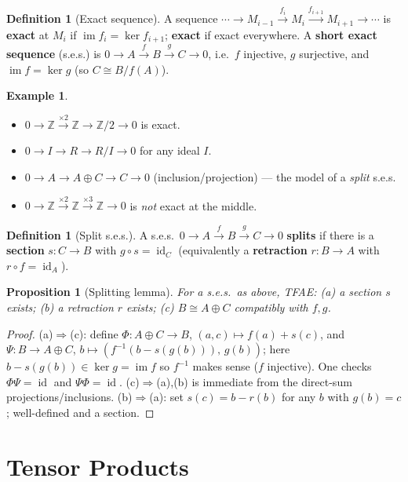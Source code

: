 \documentclass[11pt,a4paper]{article}
\newtheorem{proposition}[theorem]{Proposition}
\theoremstyle{definition}
\newtheorem{definition}[theorem]{Definition}
\newtheorem{example}[theorem]{Example}
\newcommand{\Z}{\mathbb{Z}}
\newcommand{\id}{\operatorname{id}}
\newcommand{\im}{\operatorname{im}}
\begin{document}
\begin{definition}[Exact sequence]
A sequence $\cdots\to M_{i-1}\xrightarrow{f_i} M_i\xrightarrow{f_{i+1}} M_{i+1}\to\cdots$ is
\textbf{exact} at $M_i$ if $\im f_i=\ker f_{i+1}$; \textbf{exact} if exact everywhere. A
\textbf{short exact sequence} (s.e.s.) is $0\to A\xrightarrow{f} B\xrightarrow{g} C\to0$, i.e.\
$f$ injective, $g$ surjective, and $\im f=\ker g$ (so $C\cong B/f(A)$).
\end{definition}

\begin{example}\label{ex:ses}
\begin{itemize}
  \item $0\to\Z\xrightarrow{\times2}\Z\to\Z/2\to0$ is exact.
  \item $0\to I\to R\to R/I\to0$ for any ideal $I$.
  \item $0\to A\to A\oplus C\to C\to0$ (inclusion/projection) --- the model of a \emph{split} s.e.s.
  \item $0\to\Z\xrightarrow{\times2}\Z\xrightarrow{\times3}\Z\to0$ is \emph{not} exact at the middle.
\end{itemize}
\end{example}

\begin{definition}[Split s.e.s.]
A s.e.s.\ $0\to A\xrightarrow{f} B\xrightarrow{g} C\to0$ \textbf{splits} if there is a
\textbf{section} $s:C\to B$ with $g\circ s=\id_C$ (equivalently a \textbf{retraction}
$r:B\to A$ with $r\circ f=\id_A$).
\end{definition}

\begin{proposition}[Splitting lemma]\label{prop:split}
For a s.e.s.\ as above, TFAE: (a) a section $s$ exists; (b) a retraction $r$ exists;
(c) $B\cong A\oplus C$ compatibly with $f,g$.
\end{proposition}
\begin{proof}
(a)$\Rightarrow$(c): define $\Phi:A\oplus C\to B$, $(a,c)\mapsto f(a)+s(c)$, and
$\Psi:B\to A\oplus C$, $b\mapsto (f^{-1}(b-s(g(b))),\,g(b))$; here $b-s(g(b))\in\ker g=\im f$ so
$f^{-1}$ makes sense ($f$ injective). One checks $\Phi\Psi=\id$ and $\Psi\Phi=\id$.
(c)$\Rightarrow$(a),(b) is immediate from the direct-sum projections/inclusions.
(b)$\Rightarrow$(a): set $s(c)=b-r(b)$ for any $b$ with $g(b)=c$; well-defined and a section.
\end{proof}

\section{Tensor Products}
\end{document}
